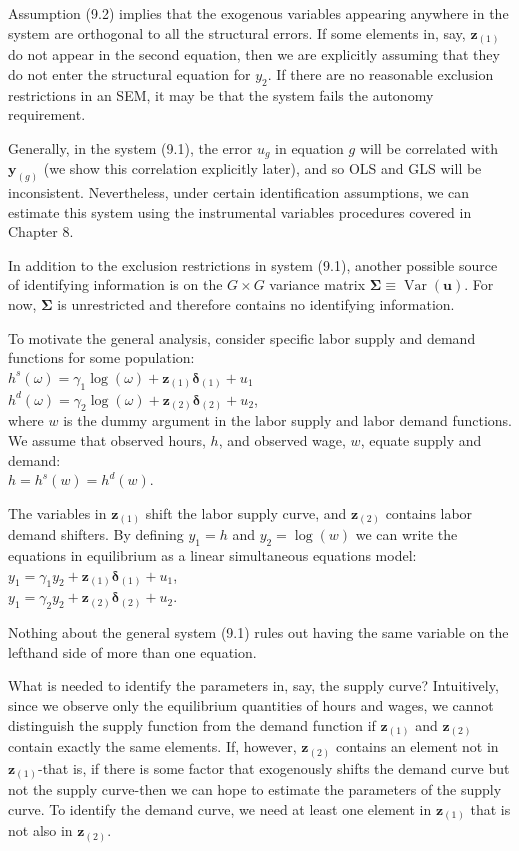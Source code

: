 \documentclass[10pt]{article}
\begin{document}
Assumption (9.2) implies that the exogenous variables appearing anywhere in the system are orthogonal to all the structural errors. If some elements in, say, $\mathbf{z}_{(1)}$ do not appear in the second equation, then we are explicitly assuming that they do not enter the structural equation for $y_{2}$. If there are no reasonable exclusion restrictions in an SEM, it may be that the system fails the autonomy requirement.

Generally, in the system (9.1), the error $u_{g}$ in equation $g$ will be correlated with $\mathbf{y}_{(g)}$ (we show this correlation explicitly later), and so OLS and GLS will be inconsistent. Nevertheless, under certain identification assumptions, we can estimate this system using the instrumental variables procedures covered in Chapter 8.

In addition to the exclusion restrictions in system (9.1), another possible source of identifying information is on the $G \times G$ variance matrix $\boldsymbol{\Sigma} \equiv \operatorname{Var}(\mathbf{u})$. For now, $\boldsymbol{\Sigma}$ is unrestricted and therefore contains no identifying information.

To motivate the general analysis, consider specific labor supply and demand functions for some population:\\
$h^{s}(\omega)=\gamma_{1} \log (\omega)+\mathbf{z}_{(1)} \boldsymbol{\delta}_{(1)}+u_{1}$\\
$h^{d}(\omega)=\gamma_{2} \log (\omega)+\mathbf{z}_{(2)} \boldsymbol{\delta}_{(2)}+u_{2}$,\\
where $w$ is the dummy argument in the labor supply and labor demand functions. We assume that observed hours, $h$, and observed wage, $w$, equate supply and demand:\\
$h=h^{s}(w)=h^{d}(w)$.

The variables in $\mathbf{z}_{(1)}$ shift the labor supply curve, and $\mathbf{z}_{(2)}$ contains labor demand shifters. By defining $y_{1}=h$ and $y_{2}=\log (w)$ we can write the equations in equilibrium as a linear simultaneous equations model:\\
$y_{1}=\gamma_{1} y_{2}+\mathbf{z}_{(1)} \boldsymbol{\delta}_{(1)}+u_{1}$,\\
$y_{1}=\gamma_{2} y_{2}+\mathbf{z}_{(2)} \boldsymbol{\delta}_{(2)}+u_{2}$.

Nothing about the general system (9.1) rules out having the same variable on the lefthand side of more than one equation.

What is needed to identify the parameters in, say, the supply curve? Intuitively, since we observe only the equilibrium quantities of hours and wages, we cannot distinguish the supply function from the demand function if $\mathbf{z}_{(1)}$ and $\mathbf{z}_{(2)}$ contain exactly the same elements. If, however, $\mathbf{z}_{(2)}$ contains an element not in $\mathbf{z}_{(1)}$-that is, if there is some factor that exogenously shifts the demand curve but not the supply curve-then we can hope to estimate the parameters of the supply curve. To identify the demand curve, we need at least one element in $\mathbf{z}_{(1)}$ that is not also in $\mathbf{z}_{(2)}$.
\end{document}
